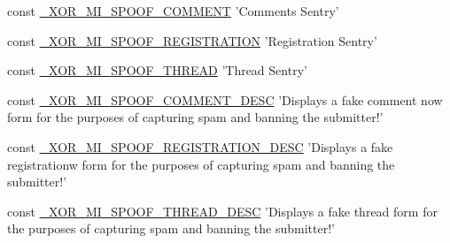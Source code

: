 \begin{DoxyCompactItemize}
$$\item 
const \hyperlink{modinfo_8php_a1bb8f67ec25c264d7749c5189f85d046}{\-\_\-\-X\-O\-R\-\_\-\-M\-I\-\_\-\-S\-P\-O\-O\-F\-\_\-\-C\-O\-M\-M\-E\-N\-T} 'Comments Sentry'
\item 
const \hyperlink{modinfo_8php_ad367a868ea8fe7970fea82c356369c02}{\-\_\-\-X\-O\-R\-\_\-\-M\-I\-\_\-\-S\-P\-O\-O\-F\-\_\-\-R\-E\-G\-I\-S\-T\-R\-A\-T\-I\-O\-N} 'Registration Sentry'
\item 
const \hyperlink{modinfo_8php_a1f95a3273f03ebd3a44c47cb9d22e043}{\-\_\-\-X\-O\-R\-\_\-\-M\-I\-\_\-\-S\-P\-O\-O\-F\-\_\-\-T\-H\-R\-E\-A\-D} 'Thread Sentry'
\item 
const \hyperlink{modinfo_8php_aac1f3cacc93cb5311e57b62ffa47f067}{\-\_\-\-X\-O\-R\-\_\-\-M\-I\-\_\-\-S\-P\-O\-O\-F\-\_\-\-C\-O\-M\-M\-E\-N\-T\-\_\-\-D\-E\-S\-C} 'Displays a fake comment now form for the purposes of capturing spam and banning the submitter!'
\item 
const \hyperlink{modinfo_8php_ab118ef7252500a0aff4b7deeec6332dd}{\-\_\-\-X\-O\-R\-\_\-\-M\-I\-\_\-\-S\-P\-O\-O\-F\-\_\-\-R\-E\-G\-I\-S\-T\-R\-A\-T\-I\-O\-N\-\_\-\-D\-E\-S\-C} 'Displays a fake registrationw form for the purposes of capturing spam and banning the submitter!'
\item 
const \hyperlink{modinfo_8php_ae29b1ed03d2a15f8b7a5a5df392dc0de}{\-\_\-\-X\-O\-R\-\_\-\-M\-I\-\_\-\-S\-P\-O\-O\-F\-\_\-\-T\-H\-R\-E\-A\-D\-\_\-\-D\-E\-S\-C} 'Displays a fake thread form for the purposes of capturing spam and banning the submitter!'
\end{DoxyCompactItemize}


